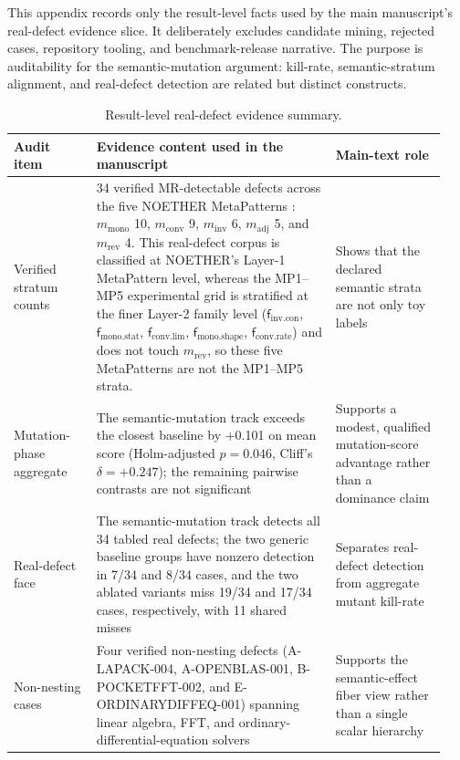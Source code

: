 \documentclass[manuscript,screen,review]{acmart}
\begin{document}
This appendix records only the result-level facts used by the main
manuscript's real-defect evidence slice. It deliberately excludes
candidate mining, rejected cases, repository tooling, and benchmark-release
narrative. The purpose is auditability for the semantic-mutation argument:
kill-rate, semantic-stratum alignment, and real-defect detection are related
but distinct constructs.

{%
\small
\begin{longtable}[]{@{}p{0.18\linewidth}p{0.52\linewidth}p{0.24\linewidth}@{}}
\caption{Result-level real-defect evidence summary.}\label{tab:realdefect-ledger}\\
\toprule\noalign{}
Audit item & Evidence content used in the manuscript & Main-text role \\
\midrule\noalign{}
\endfirsthead
\endhead
\bottomrule\noalign{}
\endlastfoot
Verified stratum counts & 34 verified MR-detectable defects across the five
NOETHER MetaPatterns \citep{noether2026}: \(m_{\mathrm{mono}}\) 10,
\(m_{\mathrm{conv}}\) 9,
\(m_{\mathrm{inv}}\) 6, \(m_{\mathrm{adj}}\) 5, and
\(m_{\mathrm{rev}}\) 4. This real-defect corpus is classified at NOETHER's
Layer-1 MetaPattern level, whereas the MP1--MP5 experimental grid is
stratified at the finer Layer-2 family level
(\(\mathsf{f}_{\mathrm{inv.con}}\), \(\mathsf{f}_{\mathrm{mono.stat}}\),
\(\mathsf{f}_{\mathrm{conv.lim}}\), \(\mathsf{f}_{\mathrm{mono.shape}}\),
\(\mathsf{f}_{\mathrm{conv.rate}}\)) and does not touch \(m_{\mathrm{rev}}\),
so these five MetaPatterns are not the MP1--MP5 strata. & Shows that the
declared semantic strata are not
only toy labels \\
Mutation-phase aggregate & The semantic-mutation track exceeds the
closest baseline by +0.101 on mean score (Holm-adjusted \(p = 0.046\),
Cliff's \(\delta = +0.247\)); the remaining pairwise contrasts are not
significant & Supports a modest, qualified
mutation-score advantage rather than a dominance claim \\
Real-defect face & The semantic-mutation track detects all 34 tabled
real defects; the two generic baseline groups have nonzero detection in
7/34 and 8/34 cases, and the two ablated variants miss 19/34 and 17/34
cases, respectively, with 11 shared misses & Separates real-defect detection from aggregate mutant
kill-rate \\
Non-nesting cases & Four verified non-nesting defects (A-LAPACK-004,
A-OPENBLAS-001, B-POCKETFFT-002, and E-ORDINARYDIFFEQ-001) spanning
linear
algebra, FFT, and ordinary-differential-equation solvers & Supports the semantic-effect fiber view rather
than a single scalar hierarchy \\
\end{longtable}
\normalsize
}
\end{document}
